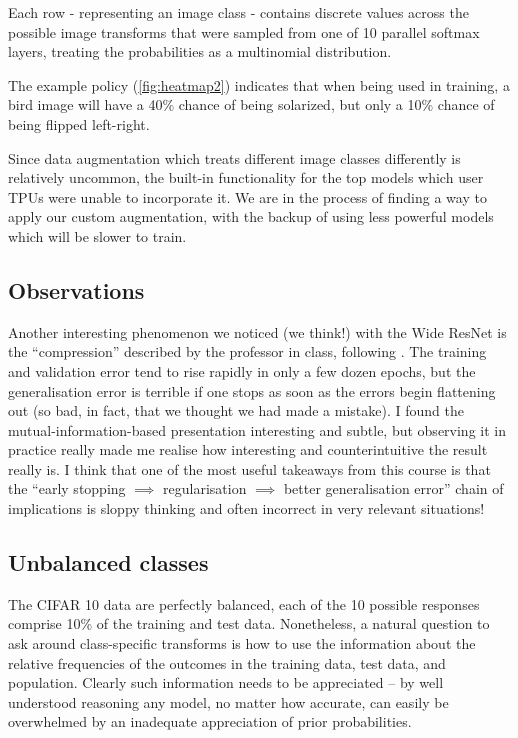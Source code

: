 \documentclass[10pt,twocolumn,letterpaper]{article}
\begin{document}
    Each row - representing an image class - contains discrete values across the possible image transforms that were sampled from one of 10 parallel softmax layers, treating the probabilities as a multinomial distribution.
		
    The example policy (\autoref{fig:heatmap2}) indicates that when being used in training, a bird image will have a 40\% chance of being solarized, but only a 10\% chance of being flipped left-right.
		
    Since data augmentation which treats different image classes differently is relatively uncommon, the built-in functionality for the top models which user TPUs were unable to incorporate it. We are in the process of finding a way to apply our custom augmentation, with the backup of using less powerful models which will be slower to train.

  \subsection{Observations}
	
    Another interesting phenomenon we noticed (we think!) with the Wide ResNet is the ``compression'' described by the professor in class, following \cite{Shwartz-Ziv2017}. The training and validation error tend to rise rapidly in only a few dozen epochs, but the generalisation error is terrible if one stops as soon as the errors begin flattening out (so bad, in fact, that we thought we had made a mistake). I found the mutual-information-based presentation interesting and subtle, but observing it in practice really made me realise how interesting and counterintuitive the result really is. I think that one of the most useful takeaways from this course is that the ``early stopping $\implies$ regularisation $\implies$ better generalisation error'' chain of implications is sloppy thinking and often incorrect in very relevant situations!


\subsection{Unbalanced classes}

The CIFAR 10 data are perfectly balanced, each of the 10 possible responses comprise 10\% of the training and test data. Nonetheless, a natural question to ask around class-specific transforms is how to use the information about the relative frequencies of the outcomes in the training data, test data, and population. Clearly such information needs to be appreciated -- by well understood reasoning %
any model, no matter how accurate, can easily be overwhelmed by an inadequate appreciation of prior probabilities. 
\end{document}
